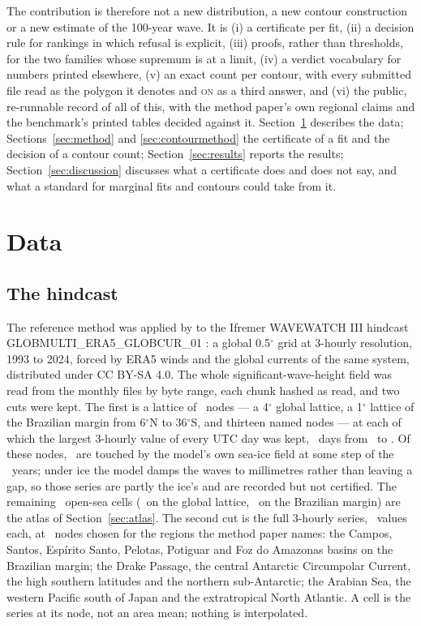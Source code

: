 \documentclass[preprint,11pt,authoryear]{elsarticle}
\begin{document}
The contribution is therefore not a new distribution, a new contour construction or a new estimate of the 100-year wave. It is (i) a certificate per fit, (ii) a decision rule for rankings in which refusal is explicit, (iii) proofs, rather than thresholds, for the two families whose supremum is at a limit, (iv) a verdict vocabulary for numbers printed elsewhere, (v) an exact count per contour, with every submitted file read as the polygon it denotes and \textsc{on} as a third answer, and (vi) the public, re-runnable record of all of this, with the method paper's own regional claims and the benchmark's printed tables decided against it. Section~\ref{sec:data} describes the data; Sections~\ref{sec:method} and \ref{sec:contourmethod} the certificate of a fit and the decision of a contour count; Section~\ref{sec:results} reports the results; Section~\ref{sec:discussion} discusses what a certificate does and does not say, and what a standard for marginal fits and contours could take from it.

\section{Data}\label{sec:data}

\subsection{The hindcast}
The reference method was applied by \citet{reis2026} to the Ifremer WAVEWATCH III hindcast GLOBMULTI\_ERA5\_GLOBCUR\_01 \citep{accensi,alday2021}: a global 0.5$^\circ$ grid at 3-hourly resolution, 1993 to 2024, forced by ERA5 winds and the global currents of the same system, distributed under CC BY-SA 4.0. The whole significant-wave-height field was read from the monthly files by byte range, each chunk hashed as read, and two cuts were kept. The first is a lattice of \ANodes\ nodes --- a 4$^\circ$ global lattice, a 1$^\circ$ lattice of the Brazilian margin from 6$^\circ$N to 36$^\circ$S, and thirteen named nodes --- at each of which the largest 3-hourly value of every UTC day was kept, \ADays\ days from \AFirst\ to \ALast. Of these nodes, \AIce\ are touched by the model's own sea-ice field at some step of the \AYears\ years; under ice the model damps the waves to millimetres rather than leaving a gap, so those series are partly the ice's and are recorded but not certified. The remaining \ACells\ open-sea cells (\AGlobalFour\ on the global lattice, \ABrazil\ on the Brazilian margin) are the atlas of Section~\ref{sec:atlas}. The second cut is the full 3-hourly series, \RNodeN\ values each, at \RNodes\ nodes chosen for the regions the method paper names: the Campos, Santos, Esp\'irito Santo, Pelotas, Potiguar and Foz do Amazonas basins on the Brazilian margin; the Drake Passage, the central Antarctic Circumpolar Current, the high southern latitudes and the northern sub-Antarctic; the Arabian Sea, the western Pacific south of Japan and the extratropical North Atlantic. A cell is the series at its node, not an area mean; nothing is interpolated.
\end{document}
